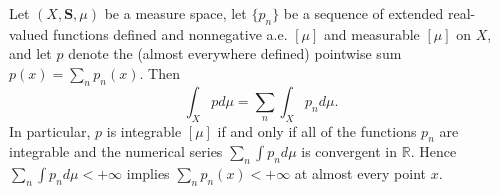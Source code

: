 Let $(X, \mathbf{S}, \mu)$ be a measure space, let $\{p_n\}$ be a sequence of extended real-valued functions defined and nonnegative a.e. $[\mu]$ and measurable $[\mu]$ on $X$, and let $p$ denote the (almost everywhere defined) pointwise sum $p(x) = \sum_n p_n(x)$. Then
$$\int_X p d\mu = \sum_n \int_X p_n d\mu.$$
In particular, $p$ is integrable $[\mu]$ if and only if all of the functions $p_n$ are integrable and the numerical series $\sum_n \int p_n d\mu$ is convergent in $\mathbb{R}$. Hence $\sum_n \int p_n d\mu < +\infty$ implies $\sum_n p_n(x) < +\infty$ at almost every point $x$.
